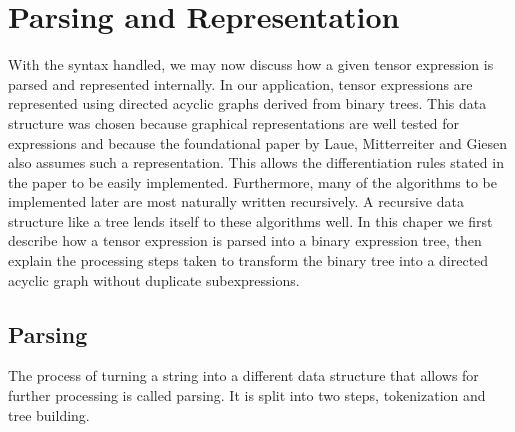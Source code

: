 \documentclass[12pt, a4paper]{report}
\begin{document}
\chapter{Parsing and Representation}
With the syntax handled, we may now discuss how a given tensor expression is parsed and represented internally.
In our application, tensor expressions are represented using directed acyclic graphs derived from binary trees.
This data structure was chosen because graphical representations are well tested for expressions and because the foundational paper by Laue, Mitterreiter and Giesen also assumes such a representation.
This allows the differentiation rules stated in the paper to be easily implemented.
Furthermore, many of the algorithms to be implemented later are most naturally written recursively.
A recursive data structure like a tree lends itself to these algorithms well.
In this chaper we first describe how a tensor expression is parsed into a binary expression tree, then explain the processing steps taken to transform the binary tree into a directed acyclic graph without duplicate subexpressions.

\section{Parsing}
The process of turning a string into a different data structure that allows for further processing is called parsing.
It is split into two steps, tokenization and tree building.
\end{document}
